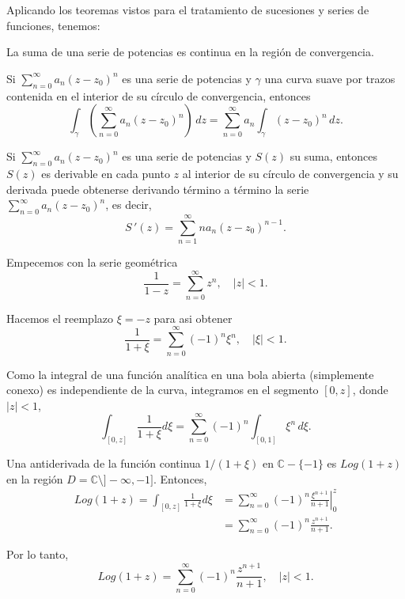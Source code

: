Aplicando los teoremas vistos para el tratamiento de sucesiones y series de funciones, tenemos:

\begin{propo}
La suma de una serie de potencias es continua en la región de convergencia.
\end{propo}

\begin{propo}\label{IntegracionPotencia}
Si $\sum\limits_{n=0}^{\infty} a_n (z-z_0)^n$ es una serie de potencias y $\gamma$ una curva suave por trazos contenida en el interior de su círculo de convergencia, entonces
$$\int_{\gamma} \left( \sum_{n=0}^{\infty} a_n (z-z_0)^n \right) \,dz = \sum_{n=0}^{\infty} a_n \int_{\gamma} (z-z_0)^n \,dz.$$
\end{propo}

\begin{propo}\label{DerivadaPotencia}
Si $\sum\limits_{n=0}^{\infty} a_n (z-z_0)^n$ es una serie de potencias y $S(z)$ su suma, entonces $S(z)$ es derivable en cada punto $z$ al interior de su círculo de convergencia y su derivada puede obtenerse derivando término a término la serie $\sum\limits_{n=0}^{\infty} a_n (z-z_0)^n$, es decir,
$$S\,'(z) = \sum_{n=1}^{\infty} n a_n (z-z_0)^{n-1}.$$
\end{propo}

\begin{ejemplo}
Empecemos con la serie geométrica
$$\frac{1}{1 - z} = \sum_{n=0}^{\infty} z^n, \quad |z| < 1.$$

Hacemos el reemplazo $\xi = - z$ para asi obtener
$$\frac{1}{1 + \xi} = \sum_{n=0}^{\infty} (-1)^n \xi^n, \quad |\xi| < 1.$$

Como la integral de una función analítica en una bola abierta (simplemente conexo) es independiente de la curva, integramos en el segmento $[0,z]$, donde $|z| < 1$, 
$$\int_{[0,z]} \frac{1}{1+\xi} d\xi = \sum_{n=0}^{\infty} (-1)^n \int_{[0,1]} \xi^n \,d\xi.$$

Una antiderivada de la función continua $1/(1+\xi)$ en $\mathbb{C} - \{-1\}$ es $Log(1 + z)$ en la región $D = \mathbb{C}\setminus ]-\infty,-1]$. Entonces,
\begin{align*}
    Log(1+z) = \int_{[0,z]} \frac{1}{1+\xi} d\xi &= \sum_{n=0}^{\infty} \left. (-1)^n \frac{\xi^{n+1}}{n+1} \right|_{0}^z \\
    &= \sum_{n=0}^{\infty} (-1)^n \frac{z^{n+1}}{n+1}.
\end{align*}

Por lo tanto,
$$Log(1+z) = \sum_{n=0}^{\infty} (-1)^n \frac{z^{n+1}}{n+1}, \quad |z| < 1.$$
\end{ejemplo}

